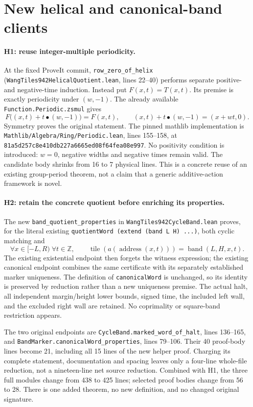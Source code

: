 \section{New helical and canonical-band clients}
\paragraph{H1: reuse integer-multiple periodicity.}
At the fixed ProveIt commit, \texttt{row\_zero\_of\_helix}
(\texttt{WangTiles942HelicalQuotient.lean}, lines 22--40) performs separate
positive- and negative-time induction.  Instead put
\(F(x,t)=T(x,t)\).  Its premise is exactly periodicity under \((w,-1)\).
The already available \texttt{Function.Periodic.zsmul} gives
\[
 F\bigl((x,t)+t\mathbin{\bullet}(w,-1)\bigr)=F(x,t),
 \qquad (x,t)+t\mathbin{\bullet}(w,-1)=(x+wt,0).
\]
Symmetry proves the original statement.  The pinned mathlib implementation
is \texttt{Mathlib/Algebra/Ring/Periodic.lean}, lines 155--158, at
\texttt{81a5d257c8e410db227a6665ed08f64fea08e997}.
No positivity condition is introduced: \(w=0\), negative widths and negative
times remain valid.  The candidate body shrinks from 16 to 7 physical lines.
This is a concrete reuse of an existing group-period theorem, not a claim
that a generic additive-action framework is novel.

\paragraph{H2: retain the concrete quotient before enriching its properties.}
The new \texttt{band\_quotient\_properties} in
\texttt{WangTiles942CycleBand.lean} proves, for the literal existing
\texttt{quotientWord (extend (band L H) ...)}, both cyclic matching and
\[
 \forall x\in[-L,R)\;\forall t\in\mathbb Z,\qquad
 \operatorname{tile}(a(\operatorname{address}(x,t)))
   =\operatorname{band}(L,H,x,t).
\]
The existing existential endpoint then forgets the witness expression;
the existing canonical endpoint combines the same certificate with its
separately established marker uniqueness.  The definition of
\texttt{canonicalWord} is unchanged, so its identity is preserved by
reduction rather than a new uniqueness premise.  The actual halt, all
independent margin/height lower bounds, signed time, the included left wall,
and the excluded right wall are retained.  No coprimality or square-band
restriction appears.

The two original endpoints are
\texttt{CycleBand.marked\_word\_of\_halt}, lines 136--165, and
\texttt{BandMarker.canonicalWord\_properties}, lines 79--106.
Their 40 proof-body lines become 21, including all 15 lines of the new
helper proof.  Charging its complete statement, documentation and spacing
leaves only a four-line whole-file reduction, not a nineteen-line net
source reduction.  Combined with H1, the three full modules change from
438 to 425 lines; selected proof bodies change from 56 to 28.  There is
one added theorem, no new definition, and no changed original signature.

